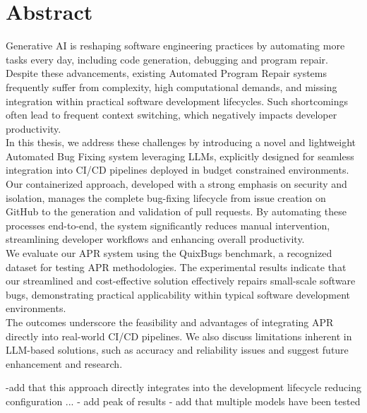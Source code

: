 \thispagestyle{empty}%

\section*{Abstract}
Generative AI is reshaping software engineering practices by automating more tasks every day, including code generation, debugging and program repair. Despite these advancements, existing Automated Program Repair systems frequently suffer from complexity, high computational demands, and missing integration within practical software development lifecycles. Such shortcomings often lead to frequent context switching, which negatively impacts developer productivity. \\
In this thesis, we address these challenges by introducing a novel and lightweight Automated Bug Fixing system leveraging LLMs, explicitly designed for seamless integration into CI/CD pipelines deployed in budget constrained environments. Our containerized approach, developed with a strong emphasis on security and isolation, manages the complete bug-fixing lifecycle from issue creation on GitHub to the generation and validation of pull requests. By automating these processes end-to-end, the system significantly reduces manual intervention, streamlining developer workflows and enhancing overall productivity.\\
We evaluate our APR system using the QuixBugs benchmark, a recognized dataset for testing APR methodologies. The experimental results indicate that our streamlined and cost-effective solution effectively repairs small-scale software bugs, demonstrating practical applicability within typical software development environments. \\
The outcomes underscore the feasibility and advantages of integrating APR directly into real-world CI/CD pipelines. We also discuss limitations inherent in LLM-based solutions, such as accuracy and reliability issues and suggest future enhancement and research.


-add that this approach directly integrates into the development lifecycle reducing configuration ...
- add peak of results
- add that multiple models have been tested 